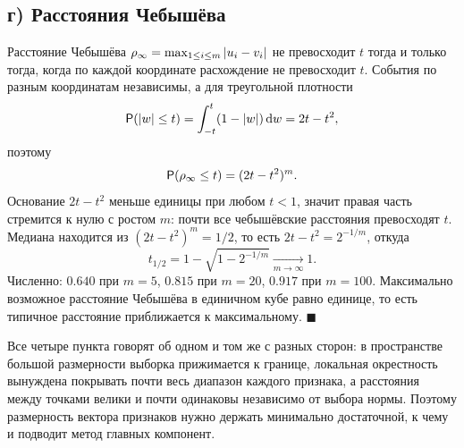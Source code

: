 \documentclass[12pt,a4paper]{article}
\begin{document}
\subsection*{г) Расстояния Чебышёва}

\resh Расстояние Чебышёва $\rho_\infty = \max_{1\le i\le m}\left\lvert u_i - v_i \right\rvert$ не
превосходит $t$ тогда и только тогда, когда по каждой координате расхождение не
превосходит $t$. События по разным координатам независимы, а для треугольной
плотности
\[
  \mathsf{P}(\left\lvert w \right\rvert \le t) = \int_{-t}^{t}(1 - \left\lvert w \right\rvert)\,\mathrm{d} w = 2t - t^2 ,
\]
поэтому
\begin{equation}\label{eq:cheb}
  \mathsf{P}(\rho_\infty \le t) = (2t - t^2)^m .
\end{equation}
Основание $2t - t^2$ меньше единицы при любом $t < 1$, значит правая часть
стремится к нулю с ростом $m$: почти все чебышёвские расстояния превосходят $t$.
Медиана находится из $ (2t-t^2)^m = 1/2$, то есть $2t - t^2 = 2^{-1/m}$, откуда
\[
  t_{1/2} = 1 - \sqrt{1 - 2^{-1/m}}
  \xrightarrow[m \to \infty]{} 1 .
\]
Численно: $0.640$ при $m = 5$, $0.815$ при $m = 20$, $0.917$ при $m = 100$.
Максимально возможное расстояние Чебышёва в единичном кубе равно единице, то
есть типичное расстояние приближается к максимальному. $\blacksquare$

\smallskip
Все четыре пункта говорят об одном и том же с разных сторон: в пространстве
большой размерности выборка прижимается к границе, локальная окрестность
вынуждена покрывать почти весь диапазон каждого признака, а расстояния между
точками велики и почти одинаковы независимо от выбора нормы. Поэтому
размерность вектора признаков нужно держать минимально достаточной, к чему и
подводит метод главных компонент.
\end{document}
